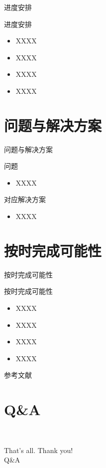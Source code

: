 \documentclass[compress]{beamer}
\begin{document}
\begin{frame}{进度安排}
  \begin{block}{进度安排}
    \begin{itemize}
      \setlength{\itemsep}{6pt}
      \item XXXX\cite{liu2016}
      \item XXXX\cite{ren2010}
      \item XXXX
      \item XXXX
    \end{itemize}
  \end{block}
\end{frame}

\section{问题与解决方案}

\begin{frame}{问题与解决方案}
  \begin{block}{问题}
    \begin{itemize}
      \item XXXX
    \end{itemize}
  \end{block}
  \begin{block}{对应解决方案}
    \begin{itemize}
      \item XXXX
    \end{itemize}
  \end{block}
\end{frame}

\section{按时完成可能性}

\begin{frame}{按时完成可能性}
  \begin{block}{按时完成可能性}
    \begin{itemize}
      \setlength{\itemsep}{6pt}
      \item XXXX\cite{Chen1992}
      \item XXXX\cite{Gravagne2003}
      \item XXXX\cite{xin1994}
      \item XXXX\cite{zhai2015}
    \end{itemize}
  \end{block}
\end{frame}



\begin{frame}[allowframebreaks]{参考文献}
  
\end{frame}

\section{Q\&A}

\begin{frame}{\secname~ }
	\begin{center}
 		\huge {That's all. Thank you!}\\
		\vspace{1cm}
		\huge {Q\&A}
	\end{center}
\end{frame}
\end{document}
